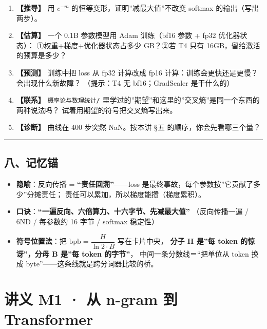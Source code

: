 \documentclass[
  chinese,
  11pt,
]{ctexart}
\providecommand{\tightlist}{%
  \setlength{\itemsep}{0pt}\setlength{\parskip}{0pt}}
\begin{document}
\begin{enumerate}
\def\labelenumi{\arabic{enumi}.}
\tightlist
\item
  \textbf{【推导】} 用 \(e^{-m}\) 的恒等变形，证明''减最大值''不改变 softmax 的输出（写出两步）。
\item
  \textbf{【估算】} 一个 0.1B 参数模型用 Adam 训练（bf16 参数 + fp32 优化器状态）： ①权重+梯度+优化器状态占多少 GB？②若 T4 只有 16GB，留给激活的预算是多少？
\item
  \textbf{【预测】} 训练中把 loss 从 fp32 计算改成 fp16 计算：训练会更快还是更慢？会出现什么新故障？ （提示：T4 无 bf16；GradScaler 是干什么的）
\item
  \textbf{【联系】} \texttt{概率论与数理统计/} 里学过的''期望''和这里的''交叉熵''是同一个东西的两种说法吗？ 试着用期望的符号把交叉熵写出来。
\item
  \textbf{【诊断】} 曲线在 400 步突然 NaN。按本讲 §五 的顺序，你会先看哪三个量？
\end{enumerate}

\begin{center}\rule{0.5\linewidth}{0.5pt}\end{center}

\subsection{八、记忆锚}\label{ux516bux8bb0ux5fc6ux951a}

\begin{itemize}
\tightlist
\item
  \textbf{隐喻}：反向传播 = \textbf{``责任回溯''}------loss 是最终事故，每个参数按''它贡献了多少''分摊责任； 责任可以累加，所以梯度能攒（梯度累积）。
\item
  \textbf{口诀}：\textbf{``一遍反向、六倍算力、十六字节、先减最大值''} （反向传播一遍 / 6ND / 每参数约 16 字节 / softmax 稳定性）
\item
  \textbf{符号位置法}：把 \(\mathrm{bpb} = \dfrac{H}{\ln 2 \cdot B}\) 写在卡片中央， \textbf{分子 H 是''每 token 的惊讶''，分母 B 是''每 token 的字节''}， 中间一条分数线＝``把单位从 token 换成 byte''------这条线就是跨分词器比较的桥。
\end{itemize}

\newpage

\section{讲义 M1 · 从 n-gram 到 Transformer}\label{ux8bb2ux4e49-m1-ux4ece-n-gram-ux5230-transformer}
\end{document}
